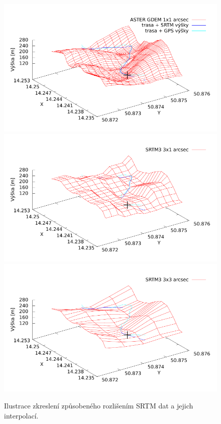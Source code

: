 \documentclass[thesis=B,czech]{FITthesis}[2012/06/26]
\begin{document}
\begin{figure}[]
\centering
\includegraphics[width=130mm,trim=0 5mm 0 10mm]{grafy/3D-aster1.pdf}
\includegraphics[width=130mm,trim=0 5mm 0 5mm]{grafy/3D-srtm3x1.pdf}
\includegraphics[width=130mm,trim=0 5mm 0 5mm]{grafy/3D-srtm3.pdf}
\caption{Ilustrace zkreslení způsobeného rozlišením SRTM dat a jejich interpolací. }
\label{img:hrensko}
\end{figure}
\end{document}
